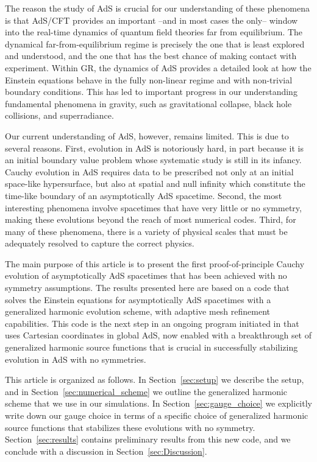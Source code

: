\documentclass[12pt]{iopart}
\begin{document}
The reason the study of AdS is crucial for our understanding of these phenomena is that AdS/CFT provides an important --and in most cases the only-- window into the real-time dynamics of quantum field theories far from equilibrium. 
The dynamical far-from-equilibrium regime is precisely the one that is least explored and understood, and the one that has the best chance of making contact with experiment.
Within GR, the dynamics of AdS provides a detailed look at how the Einstein equations behave in the fully non-linear regime and with non-trivial boundary conditions.
This has led to important progress in our understanding fundamental phenomena in gravity, such as gravitational collapse, black hole collisions, and superradiance. 

Our current understanding of AdS, however, remains limited. 
This is due to several reasons.
First, evolution in AdS is notoriously hard, in part because it is an initial boundary value problem whose systematic study is still in its infancy. 
Cauchy evolution in AdS requires data to be prescribed not only at an initial space-like hypersurface, but also at spatial and null infinity which constitute the time-like boundary of an asymptotically AdS spacetime.
Second, the most interesting phenomena involve spacetimes that have very little or no symmetry, making these evolutions beyond the reach of most numerical codes. 
Third, for many of these phenomena, there is a variety of physical scales that must be adequately resolved to capture the correct physics.

The main purpose of this article is to present the first proof-of-principle Cauchy evolution of asymptotically AdS spacetimes that has been achieved with no symmetry assumptions.
The results presented here are based on a code that solves the Einstein equations for asymptotically AdS spacetimes with a generalized harmonic evolution scheme, with adaptive mesh refinement capabilities. 
This code is the next step in an ongoing program initiated in \cite{Bantilan:2017kok} that uses Cartesian coordinates in global AdS, now enabled with a breakthrough set of generalized harmonic source functions that is crucial in successfully stabilizing evolution in AdS with no symmetries.

This article is organized as follows. 
In Section~\ref{sec:setup} we describe the setup, and in Section~\ref{sec:numerical_scheme} we outline the generalized harmonic scheme that we use in our simulations.
In Section~\ref{sec:gauge_choice} we explicitly write down our gauge choice in terms of a specific choice of generalized harmonic source functions that stabilizes these evolutions with no symmetry.
Section~\ref{sec:results} contains preliminary results from this new code, and we conclude with a discussion in Section~\ref{sec:Discussion}.
\end{document}
